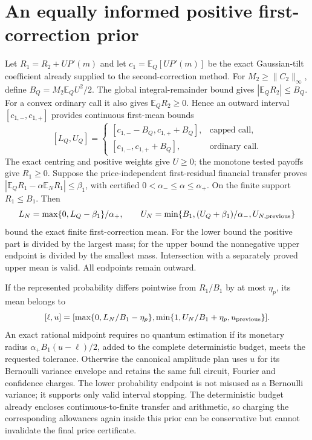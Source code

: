 \section{An equally informed positive first-correction prior}
Let $R_1=R_2+UP'(m)$ and let $c_1=\mathbb E_Q[UP'(m)]$ be the exact
Gaussian-tilt coefficient already supplied to the second-correction method.
For $M_2\geq\|C_2\|_\infty$, define
$B_Q=M_2\mathbb E_Q U^2/2$. The global integral-remainder bound gives
$|\mathbb E_Q R_2|\leq B_Q$. For a convex ordinary call it also gives
$\mathbb E_Q R_2\geq0$. Hence an outward interval $[c_{1,-},c_{1,+}]$
provides continuous first-mean bounds
\[
 [L_Q,U_Q]=
 \begin{cases}
 [c_{1,-}-B_Q,c_{1,+}+B_Q],&\text{capped call},\\
 [c_{1,-},c_{1,+}+B_Q],&\text{ordinary call}.
 \end{cases}
\]
The exact centring and positive weights give $U\geq0$; the monotone tested
payoffs give $R_1\geq0$. Suppose the price-independent first-residual
financial transfer proves
$|\mathbb E_Q R_1-\alpha\mathbb E_N R_1|\leq\beta_1$, with certified
$0<\alpha_-\leq\alpha\leq\alpha_+$. On the finite support $R_1\leq B_1$.
Then
\[
 L_N=\max\{0,L_Q-\beta_1\}/\alpha_+,\qquad
 U_N=\min\{B_1,(U_Q+\beta_1)/\alpha_-,U_{N,\rm previous}\}
\]
bound the exact finite first-correction mean. For the lower bound the
positive part is divided by the largest mass; for the upper bound the
nonnegative upper endpoint is divided by the smallest mass. Intersection
with a separately proved upper mean is valid. All endpoints remain outward.

If the represented probability differs pointwise from $R_1/B_1$ by at most
$\eta_p$, its mean belongs to
\[
 [\ell,u]=[\max\{0,L_N/B_1-\eta_p\},
 \min\{1,U_N/B_1+\eta_p,u_{\rm previous}\}].
\]
An exact rational midpoint requires no quantum estimation if its monetary
radius $\alpha_+B_1(u-\ell)/2$, added to the complete deterministic budget,
meets the requested tolerance. Otherwise the canonical amplitude plan uses
$u$ for its Bernoulli variance envelope and retains the same full circuit,
Fourier and confidence charges. The lower probability endpoint is not
misused as a Bernoulli variance; it supports only valid interval stopping.
The deterministic budget already encloses continuous-to-finite transfer
and arithmetic, so charging the corresponding allowances again inside this
prior can be conservative but cannot invalidate the final price certificate.

